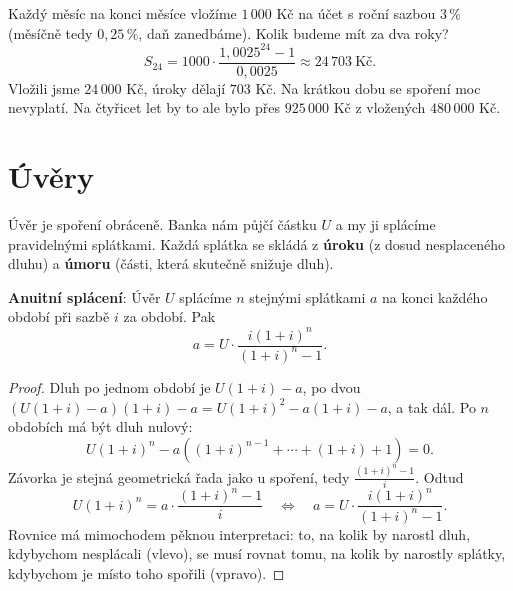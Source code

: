 \begin{example}
  Každý měsíc na konci měsíce vložíme $1\,000$ Kč na účet s roční sazbou $3\,\%$ (měsíčně tedy $0{,}25\,\%$, daň zanedbáme). Kolik budeme mít za dva roky?
  \begin{equation*}
    S_{24} = 1000\cdot\frac{1{,}0025^{24} - 1}{0{,}0025}\approx 24\,703\ \text{Kč}.
  \end{equation*}
  Vložili jsme $24\,000$ Kč, úroky dělají $703$ Kč. Na krátkou dobu se spoření moc nevyplatí. Na čtyřicet let by to ale bylo přes $925\,000$ Kč z vložených $480\,000$ Kč.
\end{example}

\section{Úvěry}\label{sec:uvery}

Úvěr je spoření obráceně. Banka nám půjčí částku $U$ a my ji splácíme pravidelnými splátkami. Každá splátka se skládá z \textbf{úroku} (z dosud nesplaceného dluhu) a \textbf{úmoru} (části, která skutečně snižuje dluh).

\begin{definitionbox}
  \textbf{Anuitní splácení}: Úvěr $U$ splácíme $n$ stejnými splátkami $a$ na konci každého období při sazbě $i$ za období. Pak
  \begin{equation*}
    a = U\cdot\frac{i{(1 + i)}^n}{{(1 + i)}^n - 1}.
  \end{equation*}
\end{definitionbox}

\begin{proof}
  Dluh po jednom období je $U(1 + i) - a$, po dvou $\left(U(1 + i) - a\right)(1 + i) - a = U{(1 + i)}^2 - a(1 + i) - a$, a tak dál. Po $n$ obdobích má být dluh nulový:
  \begin{equation*}
    U{(1 + i)}^n - a\left({(1 + i)}^{n-1} + \cdots + (1 + i) + 1\right) = 0.
  \end{equation*}
  Závorka je stejná geometrická řada jako u spoření, tedy $\frac{{(1 + i)}^n - 1}{i}$. Odtud
  \begin{equation*}
    U{(1 + i)}^n = a\cdot\frac{{(1 + i)}^n - 1}{i}\quad\Leftrightarrow\quad a = U\cdot\frac{i{(1 + i)}^n}{{(1 + i)}^n - 1}.
  \end{equation*}
  Rovnice má mimochodem pěknou interpretaci: to, na kolik by narostl dluh, kdybychom nesplácali (vlevo), se musí rovnat tomu, na kolik by narostly splátky, kdybychom je místo toho spořili (vpravo).
\end{proof}

